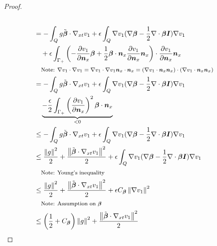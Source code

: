 \documentclass{article}
\theoremstyle{definition}
\theoremstyle{remark}
\begin{document}
\begin{proof}
\begin{align*}
\\
%
&=-\int_Q g\tilde\bfbeta\cdot\Gradxt v_1
+\epsilon\int_Q\Grad v_1(\Grad\bfbeta-\frac{1}{2}\Div\bfbeta\bfI)\Grad v_1\\
&\quad
+\epsilon\int_{\Gamma_+}\LRp{-\pd{v_1}{\bfn_x}\bfbeta
+\frac{1}{2}\bfbeta\cdot\bfn_x\pd{v_1}{\bfn_x}\bfn_x}\cdot\pd{v_1}{\bfn_x}\bfn_x\\
&\quad\footnotesize{\text{Note: }\Grad v_1\cdot\Grad v_1=\Grad v_1\cdot\Grad v_1\bfn_x\cdot\bfn_x=
(\Grad v_1\cdot\bfn_x\bfn_x)\cdot(\Grad v_1\cdot\bfn_x\bfn_x)}
\\
%
&=-\int_Q g\tilde\bfbeta\cdot\Gradxt v_1
+\epsilon\int_Q\Grad v_1(\Grad\bfbeta-\frac{1}{2}\Div\bfbeta\bfI)\Grad v_1\\
&\quad
\underbrace{-\frac{\epsilon}{2}\int_{\Gamma_+}\LRp{\pd{v_1}{\bfn_x}}^2\bfbeta\cdot\bfn_x}_{<0}\\
%
&\leq-\int_Q g\tilde\bfbeta\cdot\Gradxt v_1
+\epsilon\int_Q\Grad v_1(\Grad\bfbeta-\frac{1}{2}\Div\bfbeta\bfI)\Grad v_1\\
%
&\leq\frac{\norm{g}^2}{2}+\frac{\norm{\tilde\bfbeta\cdot\Gradxt v_1}^2}{2}
+\epsilon\int_Q\Grad v_1(\Grad\bfbeta-\frac{1}{2}\Div\bfbeta\bfI)\Grad v_1\\
&\quad\footnotesize{\text{Note: Young's inequality}}
\\
%
&\leq\frac{\norm{g}^2}{2}+\frac{\norm{\tilde\bfbeta\cdot\Gradxt v_1}^2}{2}
+\epsilon C_{\bfbeta}\norm{\Grad v_1}^2\\
&\quad\footnotesize{\text{Note: Assumption on }\bfbeta}
\\
%
&\leq\LRp{\frac{1}{2}+C_{\bfbeta}}\norm{g}^2+\frac{\norm{\tilde\bfbeta\cdot\Gradxt v_1}^2}{2}
\end{align*}
\end{proof}
\end{document}
